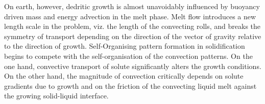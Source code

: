 \documentclass[a4paper]{report}
\begin{document}
On earth, however, dedritic growth is almost unavoidably influenced by buoyancy driven 
mass and energy advection in the melt phase. Melt flow introduces a new length scale in 
the problem, viz. the length of the convecting rolls, and breaks the symmetry of transport 
depending on the direction of the vector of gravity relative to the direction of growth. 
Self-Organising pattern formation in solidification begins to compete with the self-organisation 
of the convection patterns. On the one hand, convective transport of solute significantly alters the 
growth conditions. On the other hand, the magnitude of convection critically depends on solute 
gradients due to growth and on the friction of the convecting liquid melt against the 
growing solid-liquid interface\cite{Stein}.


%
%
%
%
\end{document}
